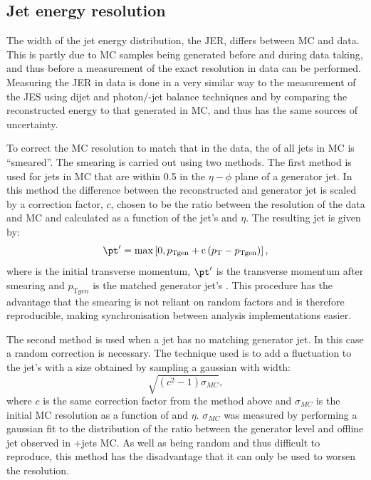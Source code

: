 \subsection{Jet energy resolution}
\label{sec:promptjer}
The width of the jet energy distribution, the \ac{JER}, differs between \ac{MC} and data. This is partly due to \ac{MC} samples being generated before and during data taking, and thus before a measurement of the exact resolution in data can be performed. Measuring the \ac{JER} in data is done in a very similar way to the measurement of the \ac{JES} using dijet and photon/\PZ-jet balance techniques and by comparing the reconstructed energy to that generated in \ac{MC}, and thus has the same sources of uncertainty.

To correct the \ac{MC} resolution to match that in the data, the \pt of all jets in \ac{MC} is ``smeared''. The smearing is carried out using two methods. The first method is used for jets in \ac{MC} that are within 0.5 in the $\eta-\phi$ plane of a generator jet. In this method the difference between the reconstructed and generator jet \pt is scaled by a correction factor, $c$, chosen to be the ratio between the resolution of the data and \ac{MC} and calculated as a function of the jet's \pt and $\eta$. The resulting jet \pt is given by:
\begin{equation}
  \label{eq:promptjermatched}
  \pt'=\rm{max}\left[0,\mathnormal{p}_{{\mathrm{T}}gen}+c\left(\mathnormal{p}_{\mathrm{T}}-\mathnormal{p}_{{\mathrm{T}}gen}\right)\right],
\end{equation}
where \pt is the initial transverse momentum, $\pt'$ is the transverse momentum after smearing and $p_{\mathrm{T}gen}$ is the matched generator jet's \pt. This procedure has the advantage that the smearing is not reliant on random factors and is therefore reproducible, making synchronisation between analysis implementations easier.

The second method is used when a jet has no matching generator jet. In this case a random correction is necessary. The technique used is to add a fluctuation to the jet's \pt with a size obtained by sampling a gaussian with width:
\begin{equation}
  \label{eq:promptjerunmatched}
  \sqrt{\left(c^{2}-1\right)\sigma_{MC}},
\end{equation}
where $c$ is the same correction factor from the method above and $\sigma_{MC}$ is the initial \ac{MC} resolution as a function of \pt and $\eta$. $\sigma_{MC}$ was measured by performing a gaussian fit to the distribution of the ratio between the generator level and offline jet \pt observed in \PW+jets \ac{MC}. As well as being random and thus difficult to reproduce, this method has the disadvantage that it can only be used to worsen the resolution. 

